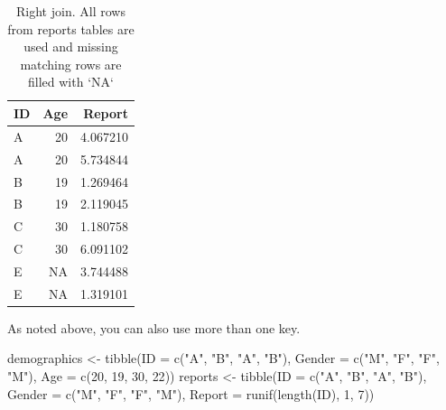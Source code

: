 \documentclass[
]{book}
\newenvironment{Shaded}{\begin{snugshade}}{\end{snugshade}}
\newcommand{\AttributeTok}[1]{\textcolor[rgb]{0.77,0.63,0.00}{#1}}
\newcommand{\DecValTok}[1]{\textcolor[rgb]{0.00,0.00,0.81}{#1}}
\newcommand{\FunctionTok}[1]{\textcolor[rgb]{0.00,0.00,0.00}{#1}}
\newcommand{\NormalTok}[1]{#1}
\newcommand{\OtherTok}[1]{\textcolor[rgb]{0.56,0.35,0.01}{#1}}
\newcommand{\StringTok}[1]{\textcolor[rgb]{0.31,0.60,0.02}{#1}}
\begin{document}
\begin{table}

\caption{\label{tab:unnamed-chunk-187}Right join. All rows from reports tables are used and missing matching rows are filled with `NA`}
\centering
\begin{tabular}[t]{l|r|r}
\hline
ID & Age & Report\\
\hline
A & 20 & 4.067210\\
\hline
A & 20 & 5.734844\\
\hline
B & 19 & 1.269464\\
\hline
B & 19 & 2.119045\\
\hline
C & 30 & 1.180758\\
\hline
C & 30 & 6.091102\\
\hline
E & NA & 3.744488\\
\hline
E & NA & 1.319101\\
\hline
\end{tabular}
\end{table}

As noted above, you can also use more than one key.

\begin{Shaded}
\begin{Highlighting}[]
\NormalTok{demographics }\OtherTok{\textless{}{-}} \FunctionTok{tibble}\NormalTok{(}\AttributeTok{ID =} \FunctionTok{c}\NormalTok{(}\StringTok{"A"}\NormalTok{, }\StringTok{"B"}\NormalTok{, }\StringTok{"A"}\NormalTok{, }\StringTok{"B"}\NormalTok{),}
                       \AttributeTok{Gender =} \FunctionTok{c}\NormalTok{(}\StringTok{"M"}\NormalTok{, }\StringTok{"F"}\NormalTok{, }\StringTok{"F"}\NormalTok{, }\StringTok{"M"}\NormalTok{),}
                       \AttributeTok{Age =} \FunctionTok{c}\NormalTok{(}\DecValTok{20}\NormalTok{, }\DecValTok{19}\NormalTok{, }\DecValTok{30}\NormalTok{, }\DecValTok{22}\NormalTok{))}
\NormalTok{reports }\OtherTok{\textless{}{-}} \FunctionTok{tibble}\NormalTok{(}\AttributeTok{ID =} \FunctionTok{c}\NormalTok{(}\StringTok{"A"}\NormalTok{, }\StringTok{"B"}\NormalTok{, }\StringTok{"A"}\NormalTok{, }\StringTok{"B"}\NormalTok{),}
                  \AttributeTok{Gender =} \FunctionTok{c}\NormalTok{(}\StringTok{"M"}\NormalTok{, }\StringTok{"F"}\NormalTok{, }\StringTok{"F"}\NormalTok{, }\StringTok{"M"}\NormalTok{),}
                  \AttributeTok{Report =} \FunctionTok{runif}\NormalTok{(}\FunctionTok{length}\NormalTok{(ID), }\DecValTok{1}\NormalTok{, }\DecValTok{7}\NormalTok{))}
\end{Highlighting}
\end{Shaded}
\end{document}
